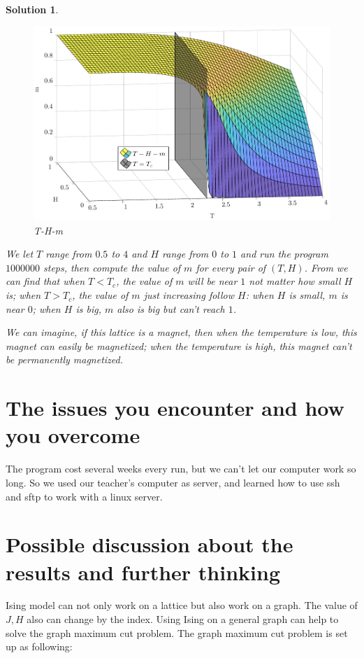 \documentclass[11pt,openany]{book}              %
\newtheorem{solution}{Solution}
\begin{document}
\begin{solution}
  \begin{figure}
    \centering
    \includegraphics[width=\linewidth]{figs/THM.pdf}
    \caption{T-H-m}
    \label{fig:THM}
  \end{figure}
  We let \(T\) range from \(0.5\) to \(4\) and \(H\) range from \(0\) to \(1\) and run the program \(1000000\) steps, then compute the value of \(m\) for every pair of \(( T,H)\).
  From  we can find that when \(T<T_c\), the value of \(m\) will be near \(1\) not matter how small \(H\) is;
  when \(T>T_c\), the value of \(m\) just increasing follow \(H\):
  when \(H\) is small, \(m\) is near \(0\);
  when \(H\) is big, \(m\) also is big but can't reach \(1\).

  We can imagine, if this lattice is a magnet, then when the temperature is low, this magnet can easily be magnetized; when the temperature is high, this magnet can't be permanently magnetized.
\end{solution}

\section{The issues you encounter and how you overcome}
The program cost several weeks every run, but we can't let our computer work so long.
So we used our teacher's computer as server, and learned how to use ssh and sftp to work with a linux server.
\section{Possible discussion about the results and further thinking}
Ising model can not only work on a lattice but also work on a graph.
The value of \(J,H\) also can change by the index.
Using Ising on a general graph can help to solve the graph maximum cut problem.
The graph maximum cut problem is set up as following:
\end{document}
